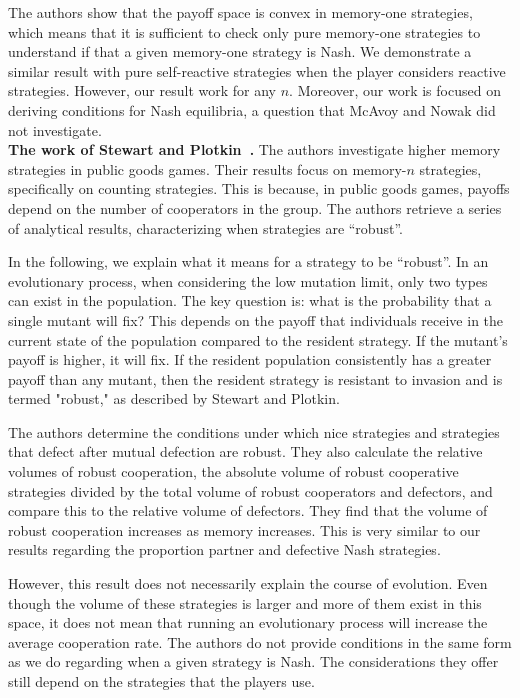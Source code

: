 \documentclass[11pt]{article}
\theoremstyle{plainCl1}
\theoremstyle{plainCl2}
\begin{document}
The authors show that the payoff space is convex in memory-one strategies, which
means that it is sufficient to check only pure memory-one strategies to
understand if that a given memory-one strategy is Nash. We demonstrate a similar
result with pure self-reactive strategies when the player considers reactive
strategies. However, our result work for any \(n\). Moreover, our work is
focused on deriving conditions for Nash equilibria, a question that McAvoy and
Nowak did not investigate. \\


\noindent
{\bf The work of Stewart and Plotkin~\cite{stewart:scientific:2016}.}
The authors investigate higher memory strategies in public goods games. Their
results focus on memory-\(n\) strategies, specifically on
counting strategies. This is because, in public goods games, payoffs
depend on the number of cooperators in the group. The authors retrieve a series
of analytical results, characterizing when strategies are ``robust''.

In the following, we explain what it means for a strategy to be ``robust''. In
an evolutionary process, when considering the low mutation limit, only two types
can exist in the population. The key question is: what is the probability that a
single mutant will fix? This depends on the payoff that individuals receive in
the current state of the population compared to the resident strategy. If the
mutant's payoff is higher, it will fix. If the resident population consistently
has a greater payoff than any mutant, then the resident strategy is resistant to
invasion and is termed "robust," as described by Stewart and Plotkin.

The authors determine the conditions under which nice strategies and strategies
that defect after mutual defection are robust. They also calculate the relative
volumes of robust cooperation, the absolute volume of robust cooperative
strategies divided by the total volume of robust cooperators and defectors, and
compare this to the relative volume of defectors. They find that the volume of
robust cooperation increases as memory increases. This is very similar to our
results regarding the proportion partner and defective Nash strategies.

However, this result does not necessarily explain the course of evolution. Even
though the volume of these strategies is larger and more of them exist in this
space, it does not mean that running an evolutionary process will increase the
average cooperation rate. The authors do not provide conditions in the same form
as we do regarding when a given strategy is Nash. The considerations they offer
still depend on the strategies that the players use.
\end{document}
